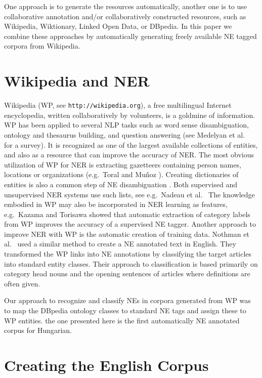 \documentclass{llncs}
\begin{document}
One approach is to generate the resources automatically, another one is to use
collaborative annotation and/or collaboratively constructed resources, such as
Wikipedia, Wiktionary, Linked Open Data, or DBpedia. In this paper we combine
these approaches by automatically generating freely available NE tagged
corpora from Wikipedia.

\section{Wikipedia and NER}

Wikipedia (WP, see {\tt http://wikipedia.org}), a free
multilingual Internet encyclopedia, written collaboratively by volunteers, is
a goldmine of information.
WP has been applied to several NLP tasks such as word sense
disambiguation, ontology and thesaurus building, and question answering (see
Medelyan et al.~\cite{Medelyan:09} for a survey). It is recognized as one
of the largest available collections of entities, and also as a resource that
can improve the accuracy of NER. The most obvious utilization of WP for NER is
extracting gazetteers containing person names, locations or organizations
(e.g.~Toral and Mu\~noz \cite{Toral:06}). Creating dictionaries of
entities is also a common step of NE disambiguation
\cite{Bunescu:06,Cucerzan:07}. Both supervised and unsupervised NER systems
use such lists, see e.g.~Nadeau et al.~\cite{Nadeau:06} The knowledge
embodied in WP may also be incorporated in NER learning as features,
e.g.~Kazama and Torisawa \cite{Kazama:07} showed that automatic
extraction of category labels from WP improves the accuracy of a supervised NE
tagger.
Another approach to improve NER with WP is the automatic creation of training
data. Nothman et al.~\cite{Nothman:08} used a similar method to create
a NE annotated text in English. They transformed the WP links into NE
annotations by classifying the target articles into standard entity
classes. Their approach to classification is based primarily on category head
nouns and the opening sentences of articles where definitions are often given.

Our approach to recognize and classify NEs in corpora generated from WP was to
map the DBpedia ontology classes to standard NE tags and assign these to WP
entities. the one presented here is the first automatically NE annotated corpus for Hungarian.

\section{Creating the English Corpus}
\end{document}
